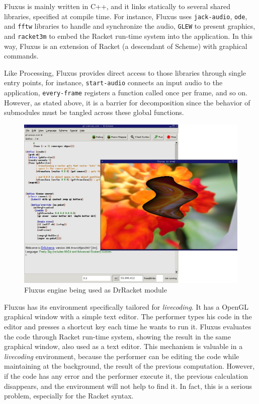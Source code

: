 Fluxus is mainly written in C++, and it links statically to several shared libraries, specified at compile time. For instance, Fluxus uses \texttt{jack-audio}, \texttt{ode}, and \texttt{fftw} libraries to handle and synchronize the audio, \texttt{GLEW} to present graphics, and \texttt{racket3m} to embed the Racket run-time system into the application. In this way, Fluxus is an extension of Racket (a descendant of Scheme) with graphical commands.

Like Processing, Fluxus provides direct access to those libraries through single entry points, for instance, \texttt{start-audio} connects an input audio to the application, \texttt{every-frame} registers a function called once per frame, and so on. However, as stated above, it is a barrier for decomposition since the behavior of submodules must be tangled across these global functions.

\begin{figure}[!htbp]
  \centering
  \includegraphics[width=.8\textwidth]{images/fluxus}
    \caption{Fluxus engine being used as DrRacket module}
  \label{fig:fluxus}
\end{figure} 

Fluxus has its environment specifically tailored for \textit{livecoding}. It has a OpenGL graphical window with a simple text editor. The performer types his code in the editor and presses a shortcut key each time he wants to run it. Fluxus evaluates the code through Racket run-time system, showing the result in the same graphical window, also used as a text editor. This mechanism is valuable in a \textit{livecoding} environment, because the performer can be editing the code while maintaining at the background, the result of the previous computation. However, if the code has any error and the performer execute it, the previous calculation disappears, and the environment will not help to find it. In fact, this is a serious problem, especially for the Racket syntax.

